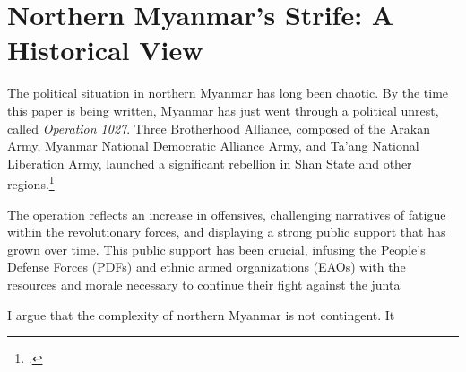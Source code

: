\documentclass{article}
\begin{document}
\section{Northern Myanmar's Strife: A Historical View}

The political situation in northern Myanmar has long been chaotic. By the time this paper is being written, Myanmar has just went through a political unrest, called \textit{Operation 1027}. Three Brotherhood Alliance, composed of the Arakan Army, Myanmar National Democratic Alliance Army, and Ta’ang National Liberation Army, launched a significant rebellion in Shan State and other regions.\footcite{Operation1027Changing}

The operation reflects an increase in offensives, challenging narratives of fatigue within the revolutionary forces, and displaying a strong public support that has grown over time. This public support has been crucial, infusing the People’s Defense Forces (PDFs) and ethnic armed organizations (EAOs) with the resources and morale necessary to continue their fight against the junta​


I argue that the complexity of northern Myanmar is not contingent. It 
\end{document}
